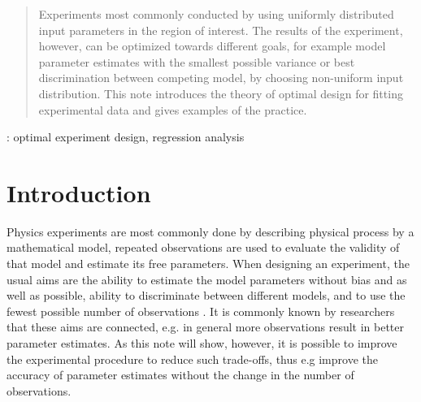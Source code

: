 \documentclass[12pt]{iopart}
\begin{document}
\author{G Imreh and W-Y Cheng}
\address{Institute of Atomic and Molecular Sciences, Academia Sinica, Taiwan}
\begin{abstract}
Experiments most commonly conducted by using uniformly distributed input parameters in the region of interest. The results of the experiment, however, can be optimized towards different goals, for example model parameter estimates with the smallest possible variance or best discrimination between competing model, by choosing non-uniform input distribution. This note introduces the theory of optimal design for fitting experimental data and gives examples of the practice.
\end{abstract}

: optimal experiment design, regression analysis




\section{Introduction}

Physics experiments are most commonly done by describing physical process by a mathematical model, repeated observations are used to evaluate the validity of that model and estimate its free parameters. When designing an experiment, the usual aims are the ability to estimate the model parameters without bias and as well as possible, ability to discriminate between different models, and to use the fewest possible number of observations \cite{Box1975,Box1987}. It is commonly known by researchers that these aims are connected, e.g. in general more observations result in better parameter estimates. As this note will show, however, it is possible to improve the experimental procedure to reduce such trade-offs, thus e.g improve the accuracy of parameter estimates without the change in the number of observations.
\end{document}
